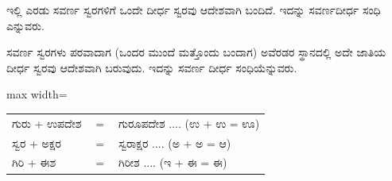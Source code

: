 \indent ಇಲ್ಲಿ ಎರಡು ಸವರ್ಣ ಸ್ವರಗಳಿಗೆ ಒಂದೇ ದೀರ್ಧ ಸ್ವರವು ಆದೇಶವಾಗಿ ಬಂದಿದೆ. ಇದನ್ನು ಸವರ್ಣದೀರ್ಧ ಸಂಧಿ ಎನ್ನುವರು.\par

\begin{kbvrule}
\hspace{0.5em}ಸವರ್ಣ ಸ್ವರಗಳು ಪರವಾದಾಗ (ಒಂದರ ಮುಂದೆ ಮತ್ತೊಂದು ಬಂದಾಗ) ಅವೆರಡರ ಸ್ಥಾನದಲ್ಲಿ ಅದೇ ಜಾತಿಯ ದೀರ್ಧ ಸ್ವರವು ಆದೇಶವಾಗಿ ಬರುವುದು. ಇದನ್ನು ಸವರ್ಣ ದೀರ್ಧ ಸಂಧಿಯೆನ್ನುವರು.
\end{kbvrule}

\vspace{3pt plus 2pt}\noindent\hspace*{1.2em}\par\vspace{1pt}

\begin{kbvderiv}
\vspace{4pt plus 3pt minus 1pt}
\begin{center}\begin{adjustbox}{max width=\textwidth}
{\renewcommand{\arraystretch}{1.22}\setlength{\tabcolsep}{4pt}
\begin{tabular}{l c l}
ಗುರು + ಉಪದೇಶ & {\color{kbvgrey}$=$} & ಗುರೂಪದೇಶ .... (ಉ + ಉ = ಊ) \\
ಸ್ವರ + ಅಕ್ಷರ & {\color{kbvgrey}$=$} & ಸ್ವರಾಕ್ಷರ .... (ಅ + ಅ = ಆ) \\
ಗಿರಿ + ಈಶ & {\color{kbvgrey}$=$} & ಗಿರೀಶ .... (ಇ + ಈ = ಈ) \\
\end{tabular}}
\end{adjustbox}\end{center}
\vspace{4pt plus 3pt minus 1pt}
\end{kbvderiv}
